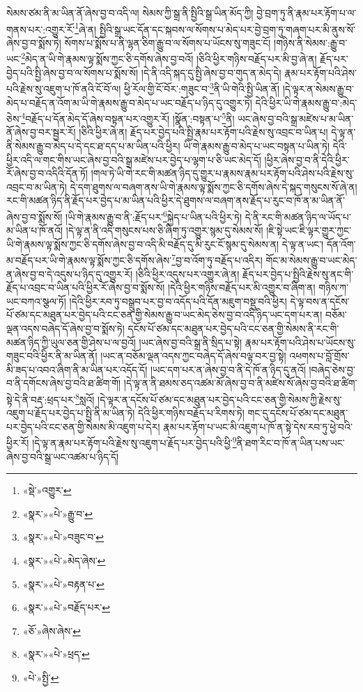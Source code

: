 སེམས་ཙམ་ནི་མ་ཡིན་ནོ་ཞེས་བྱ་བ་འདི་ལ། སེམས་ཀྱི་སྒྲ་ནི་སྤྱིའི་སྒྲ་ཡིན་མོད་ཀྱི། བྱེ་བྲག་ཏུ་ནི་རྣམ་པར་རྟོག་པ་ལ་གནས་པར་:འགྱུར་རོ་\footnote{«སྡེ་»འགྱུར་}ཞེ་ན། སྤྱིའི་སྒྲ་ཡང་དོན་དང་སྐབས་ལ་སོགས་པ་མེད་པར་བྱེ་བྲག་ཏུ་གཞག་པར་མི་ནུས་སོ་ཞེས་བྱ་བ་སྨོས་ཏེ། སོགས་པ་སྨོས་པ་ནི་ལྷན་ཅིག་རྒྱུ་བ་ལ་སོགས་པ་ཡོངས་སུ་གཟུང་ངོ། །གཉིས་ནི་སེམས་:རྒྱུ་བ་ཡང་\footnote{«སྣར་»«པེ་»རྒྱུ་བ་}མེད་ན་ཡི་གེ་རྣམས་ལྟ་སྨོས་ཀྱང་ཅི་དགོས་ཞེས་བྱ་བའོ། །ཅིའི་ཕྱིར་གཉིས་བརྗོད་པར་མི་བྱ་ཞེ་ན། རྗོད་པར་བྱེད་པའི་སྤྱི་ཞེས་བྱ་བ་ལ་སོགས་པ་སྨོས་སོ། །དེ་ནི་འདི་སྐད་དུ་སྤྱི་ཞེས་བྱ་བ་གུད་ན་མེད་དེ། རྣམ་པར་རྟོག་པའི་ཤེས་པའི་རྗེས་སུ་འཇུག་པ་ཁོ་ནའི་ངོ་བོ་ལ། ཕྱི་རོལ་གྱི་ངོ་བོར་:གཟུང་བ་\footnote{«སྣར་»«པེ་»བཟུང་བ་}ནི་ཡི་གེའི་སྤྱི་ཡིན་ནོ། །དེ་ལྟར་ན་སེམས་རྒྱུ་བ་མེད་པ་བརྗོད་ན་འོག་མ་ཡི་གེ་རྣམས་རྒྱུ་བ་མེད་པ་ཡང་བརྗོད་པ་ཉིད་དུ་འགྱུར་ཏེ། དེའི་ཕྱིར་ཡི་གེ་རྣམས་རྒྱུ་བ་:མེད་ཅེས་\footnote{«སྣར་»«པེ་»མེད་ཞེས་}བརྗོད་པ་དོན་མེད་དོ་ཞེས་བསྟན་པར་འགྱུར་རོ། །སྣོན་:བསྟན་པ་\footnote{«སྣར་»«པེ་»བརྟན་པ་}ནི། ཡང་ཞེས་བྱ་བའི་སྒྲ་མཛེས་པ་མ་ཡིན་ནོ་ཞེས་བྱ་བར་སྦྱར་རོ། །ཅིའི་ཕྱིར་ཞེ་ན། རྗོད་པར་བྱེད་པའི་སྤྱི་རྣམ་པར་རྟོག་པའི་རྗེས་སུ་འབྲང་བ་ཡིན་པ། དེ་ལྟ་ན་ནི་སེམས་རྒྱུ་བ་མེད་པ་དེ་དང་ཐ་དད་པ་མ་ཡིན་པའི་ཕྱིར། ཡི་གེ་རྣམས་རྒྱུ་བ་མེད་པ་ཡང་བསྟན་པ་ཡིན་ཏེ། དེའི་ཕྱིར་འདི་ལ་གང་གིས་ཡང་ཞེས་བྱ་བའི་སྒྲ་མཛེས་པར་བྱེད་པ་ལྷག་པ་ཅི་ཡང་མེད་དོ། །ཕྱིར་ཞེས་བྱ་བ་ནི་དེའི་ཕྱིར་རོ་ཞེས་བྱ་བ་འདིའི་དོན་ཏོ། །གལ་ཏེ་ཡི་གེ་རང་གི་མཚན་ཉིད་དུ་གྱུར་པ་རྣམས་རྣམ་པར་རྟོག་པའི་ཤེས་པའི་རྗེས་སུ་འབྲང་བ་མ་ཡིན་ཏེ། དེ་དག་ཐུགས་ལ་བཞག་ནས་ཡི་གེ་རྣམས་ལྟ་སྨོས་ཀྱང་ཅི་དགོས་ཞེས་དེ་སྐད་གསུངས་སོ་ཞེ་ན། རང་གི་མཚན་ཉིད་ནི་རྗོད་པར་བྱེད་པ་མ་ཡིན་པའི་ཕྱིར་དེ་ཐུགས་ལ་བཞག་ནས་རྗོད་པ་རུང་བ་ཁོ་ན་མ་ཡིན་ནོ་ཞེས་བྱ་བ་སྨོས་སོ། །ཡི་གེ་རྣམས་རྒྱུ་བ་ནི་:རྗོད་པར་\footnote{«སྣར་»«པེ་»བརྗོད་པར་}སྐྱེད་པ་ཡིན་པའི་ཕྱིར་ཏེ། དེ་ནི་རང་གི་མཚན་ཉིད་ལ་ཡོད་པ་མ་ཡིན་པ་ཁོ་ནའོ། །དེ་ལྟ་ན་ནི་འདི་གསུངས་པས་ཅི་ཞིག་ཏུ་འགྱུར་སྙམ་དུ་སེམས་སོ། །ཇི་སྟེ་ཡང་ཇི་ལྟར་གྱུར་ཀྱང་ཡི་གེ་རྣམས་ལྟ་སྨོས་ཀྱང་ཅི་དགོས་ཞེས་བྱ་བ་འདི་མི་བརྗོད་དུ་མི་རུང་ངོ་སྙམ་དུ་སེམས་ན། དེ་ལྟ་ན་ཡང་། དོན་འོག་མ་བརྗོད་པར་ཡི་གེ་རྣམས་ལྟ་སྨོས་ཀྱང་ཅི་དགོས་ཞེས་\footnote{«ཅོ་»ཞེས་ཞེས་}བྱ་བ་འོག་ཏུ་བརྗོད་པ་འདིར། གོང་མ་སེམས་རྒྱུ་བ་ཡང་མེད་ན་ཞེས་བྱ་བ་དེ་འདུས་པ་ཉིད་དུ་འགྱུར་རོ། །ཅིའི་ཕྱིར་འདུས་པར་འགྱུར་ཞེ་ན། རྗོད་པར་བྱེད་པ་སྤྱིའི་རྗེས་སུ་ནང་གི་རྗོད་པ་འབྲང་བ་ཡིན་པའི་ཕྱིར་རོ་ཞེས་བྱ་བ་སྨོས་སོ། །དེའི་ཕྱིར་གཉིས་བརྗོད་པར་མི་འགྱུར་བ་ཞིག་ན། གཉིས་ཀ་ཡང་བཀའ་སྩལ་ཏོ། །དེའི་ཕྱིར་རབ་ཏུ་བསྒྲུབ་པར་བྱ་བ་འདོད་པའི་དོན་མཇུག་བསྡུ་བའི་ཕྱིར། དེ་ལྟ་བས་ན་དངོས་པོ་ཙམ་དང་མཐུན་པར་བྱེད་པའི་ངང་ཅན་གྱི་སེམས་རྒྱུ་བ་ཡང་མེད་ཅེས་བྱ་བ་འདི་ཉིད་ཡང་དག་པར་ན། བཅོམ་ལྡན་འདས་བཞེད་དོ་ཞེས་བྱ་བ་སྨོས་ཏེ། དངོས་པོ་ཙམ་དང་མཐུན་པར་བྱེད་པའི་ངང་ཅན་གྱི་སེམས་ནི་རང་གི་མཚན་ཉིད་ཀྱི་ཡུལ་ཅན་གྱི་ཤེས་པ་ལ་བྱའོ། །ཡང་ཞེས་བྱ་བའི་སྒྲ་ནི་སྲིད་པ་སྟེ། རྣམ་པར་རྟོག་པའི་ཤེས་པ་ཡོངས་སུ་གཟུང་བའི་ཕྱིར་ནི་མ་ཡིན་ནོ། །ཡང་ན་བཅོམ་ལྡན་འདས་ཀྱང་བཞེད་དོ་ཞེས་བལྟ་བར་བྱ་སྟེ། འཕགས་པ་བློ་གྲོས་མི་ཟད་པ་འབའ་ཞིག་ནི་མ་ཡིན་པར་འདོད་དོ། །ཡང་དག་པར་ན་ཞེས་བྱ་བ་ནི་དེ་ཁོ་ན་ཉིད་དུ་ནའོ། །བཞེད་ཅེས་བྱ་བ་ནི་དགོངས་ཞེས་བྱ་བའི་ཐ་ཚིག་གོ། །དེ་ལྟ་ན་ནི་ཐམས་ཅད་འཚམ་མོ་ཞེས་བྱ་བ་ནི་མཛེས་སོ་ཞེས་བྱ་བའི་ཐ་ཚིག་སྟེ་དེ་ནི་བརྡ་:ཕྲད་པར་\footnote{«སྣར་»«པེ་»ཕྲད་}སླའོ། །དེ་ལྟར་ན་དངོས་པོ་ཙམ་དང་མཐུན་པར་བྱེད་པའི་ངང་ཅན་གྱི་སེམས་ཀྱི་རྗེས་སུ་འཇུག་པ་རྗོད་པར་བྱེད་པ་སྤྱི་ནི་མ་ཡིན་ཏེ། དེའི་ཕྱིར་གཉིས་བརྗོད་པ་རིགས་ཏེ། གང་དུ་དངོས་པོ་ཙམ་དང་མཐུན་པར་བྱེད་པའི་ངང་ཅན་གྱི་སེམས་མི་འཇུག་པ་དེར། རྣམ་པར་རྟོག་པ་ཡང་མི་འཇུག་པ་ཁོ་ན་སྟེ་དེས་རབ་ཏུ་ཕྱེ་བའི་ཕྱིར་རོ། །དེ་ལྟ་ན་རྣམ་པར་རྟོག་པའི་རྗེས་སུ་འཇུག་པ་རྗོད་པར་བྱེད་པའི་ཕྱི་\footnote{«པེ་»སྤྱི་}ནི་ཐག་རིང་བ་ཁོ་ན་ཡིན་པས་ཡང་ཞེས་བྱ་བའི་སྒྲ་ཡང་འཚམ་པ་ཉིད་དོ། 